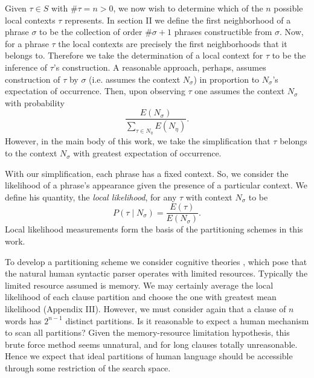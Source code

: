 Given $\tau\in S$ with $\#\tau=n>0$, we now wish to determine which of
the $n$ possible local contexts $\tau$ represents. In section II we
define the first neighborhood of a phrase $\sigma$ to be the
collection of order $\#\sigma+1$ phrases constructible from
$\sigma$. Now, for a phrase $\tau$ the local contexts are precisely
the first neighborhoods that it belongs to. Therefore we take the
determination of a local context for $\tau$ to be the inference of
$\tau$'s construction. A reasonable approach, perhaps, assumes
construction of $\tau$ by $\sigma$ (i.e. assumes the context
$N_\sigma$) in proportion to $N_\sigma$'s expectation of
occurrence. Then, upon observing $\tau$ one assumes the context
$N_\sigma$ with probability
$$\frac{E(N_\sigma)}{\underset{\tau\in N_\eta}{\sum}E(N_\eta)}.$$
However, in the main body of this work, we take the simplification
that $\tau$ belongs to the context $N_\sigma$ with greatest
expectation of occurrence.

With our simplification, each phrase has a fixed context. So, we
consider the likelihood of a phrase's appearance given the presence of
a particular context. We define his quantity, the \emph{local
likelihood}, for any $\tau$ with context $N_\sigma$ to be
$$P(\tau\mid N_\sigma)=\frac{E(\tau)}{E(N_\sigma)}.$$
Local likelihood measurements form the basis of the partitioning
schemes in this work.

To develop a partitioning scheme we consider cognitive theories
\cite{Levy01}, which pose that the natural human syntactic parser
operates with limited resources. Typically the limited resource
assumed is memory. We may certainly average the local likelihood of
each clause partition and choose the one with greatest mean likelihood
(Appendix III). However, we must consider again that a clause of $n$
words has $2^{n-1}$ distinct partitions. Is it reasonable to expect a
human mechanism to scan all partitions? Given the memory-resource
limitation hypothesis, this brute force method seems unnatural, and
for long clauses totally unreasonable. Hence we expect that ideal
partitions of human language should be accessible through some
restriction of the search space.

